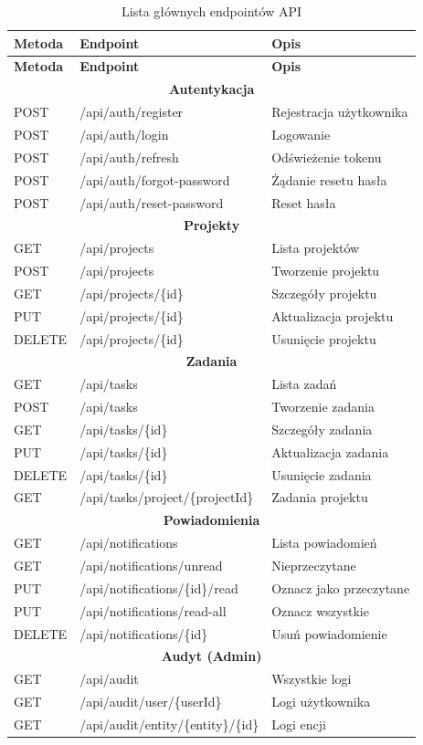 \documentclass[12pt,a4paper]{report}
\begin{document}
\begin{longtable}{|l|l|p{6cm}|}
\caption{Lista głównych endpointów API} \\
\hline
\textbf{Metoda} & \textbf{Endpoint} & \textbf{Opis} \\
\hline
\endfirsthead
\hline
\textbf{Metoda} & \textbf{Endpoint} & \textbf{Opis} \\
\hline
\endhead
\multicolumn{3}{|c|}{\textbf{Autentykacja}} \\
\hline
POST & /api/auth/register & Rejestracja użytkownika \\
POST & /api/auth/login & Logowanie \\
POST & /api/auth/refresh & Odświeżenie tokenu \\
POST & /api/auth/forgot-password & Żądanie resetu hasła \\
POST & /api/auth/reset-password & Reset hasła \\
\hline
\multicolumn{3}{|c|}{\textbf{Projekty}} \\
\hline
GET & /api/projects & Lista projektów \\
POST & /api/projects & Tworzenie projektu \\
GET & /api/projects/\{id\} & Szczegóły projektu \\
PUT & /api/projects/\{id\} & Aktualizacja projektu \\
DELETE & /api/projects/\{id\} & Usunięcie projektu \\
\hline
\multicolumn{3}{|c|}{\textbf{Zadania}} \\
\hline
GET & /api/tasks & Lista zadań \\
POST & /api/tasks & Tworzenie zadania \\
GET & /api/tasks/\{id\} & Szczegóły zadania \\
PUT & /api/tasks/\{id\} & Aktualizacja zadania \\
DELETE & /api/tasks/\{id\} & Usunięcie zadania \\
GET & /api/tasks/project/\{projectId\} & Zadania projektu \\
\hline
\multicolumn{3}{|c|}{\textbf{Powiadomienia}} \\
\hline
GET & /api/notifications & Lista powiadomień \\
GET & /api/notifications/unread & Nieprzeczytane \\
PUT & /api/notifications/\{id\}/read & Oznacz jako przeczytane \\
PUT & /api/notifications/read-all & Oznacz wszystkie \\
DELETE & /api/notifications/\{id\} & Usuń powiadomienie \\
\hline
\multicolumn{3}{|c|}{\textbf{Audyt (Admin)}} \\
\hline
GET & /api/audit & Wszystkie logi \\
GET & /api/audit/user/\{userId\} & Logi użytkownika \\
GET & /api/audit/entity/\{entity\}/\{id\} & Logi encji \\
\hline
\end{longtable}
\end{document}
